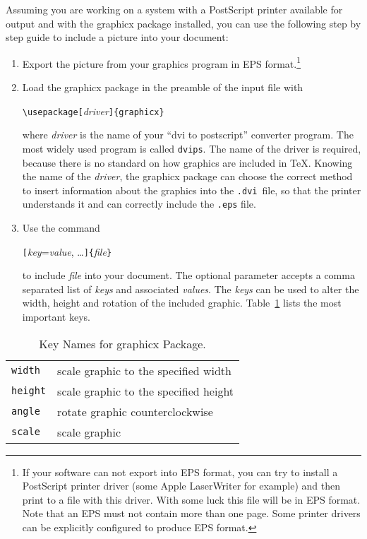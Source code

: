 Assuming you are working on a system with a
PostScript printer available for output and with the \textsf{graphicx}
package installed, you can use the following step by step guide to
include a picture into your document:

\begin{enumerate}
\item Export the picture from your graphics program in EPS
  format.\footnote{If your software can not export into EPS format, you
    can try to install a PostScript printer driver (some Apple
    LaserWriter for example) and then print to a file with this
    driver. With some luck this file will be in EPS format. Note that
    an EPS must not contain more than one page. Some printer drivers
    can be explicitly configured to produce EPS format.}
\item Load the \textsf{graphicx} package in the preamble of the input
  file with
\begin{lscommand}
\verb|\usepackage[|\emph{driver}\verb|]{graphicx}|
\end{lscommand}
where \emph{driver} is the name of your ``dvi to postscript''
converter program. The most
widely used program is called \texttt{dvips}. The name of the driver is
required, because there is no standard on how graphics are included in
\TeX{}. Knowing the name of the \emph{driver}, the
\textsf{graphicx} package can choose the correct method to insert
information about the graphics into the \texttt{.dvi}~file, so that the
printer understands it and can correctly include the \texttt{.eps} file.
\item Use the command 
\begin{lscommand}
\verb|[|\emph{key}=\emph{value}, \ldots\verb|]{|\emph{file}\verb|}|
\end{lscommand}
to include \emph{file} into your document. The optional parameter
accepts a comma separated list of \emph{keys} and associated
\emph{values}. The \emph{keys} can be used to alter the width, height
and rotation of the included graphic. Table~\ref{keyvals} lists the
most important keys.
\end{enumerate}

\begin{table}[htb]
\caption{Key Names for \textsf{graphicx} Package.}
\label{keyvals}
\begin{lined}{9cm}
\begin{tabular}{@{}ll}
\texttt{width}& scale graphic to the specified width\\
\texttt{height}& scale graphic to the specified height\\
\texttt{angle}& rotate graphic counterclockwise\\
\texttt{scale}& scale graphic \\
\end{tabular}

\bigskip
\end{lined}
\end{table}

